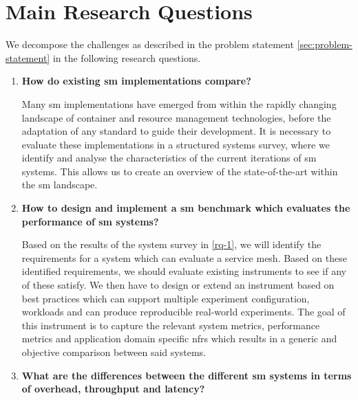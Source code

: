 \section{Main Research Questions}
\label{sec:research-questions}

We decompose the challenges as described in the problem statement \cref{sec:problem-statement} in the following research questions.




\begin{enumerate}[label=\textbf{RQ\arabic*}, leftmargin=3\parindent]
    \item \textbf{How do existing \gls{sm} implementations compare?}
    \label{rq-1}
    
    Many \gls{sm} implementations have emerged from within the rapidly changing landscape of container and resource management technologies, before the adaptation of any standard to guide their development. It is necessary to evaluate these implementations in a structured systems survey, where we identify and analyse the characteristics of the current iterations of \gls{sm} systems. This allows us to create an overview of the state-of-the-art within the \gls{sm} landscape.
    
    \item \textbf{How to design and implement a \gls{sm} benchmark which evaluates the performance of \gls{sm} systems?}
    \label{rq-2}
    
    Based on the results of the system survey in \ref{rq-1}, we will identify the requirements for a system which can evaluate a service mesh. Based on these identified requirements, we should evaluate existing instruments to see if any of these satisfy. We then have to design or extend an instrument based on best practices \cite{folkerts2012benchmarking} which can support multiple experiment configuration, workloads and can produce reproducible real-world experiments. The goal of this instrument is to capture the relevant system metrics, performance metrics and application domain specific \glspl{nfr} which results in a generic and objective comparison between said systems.

    \item \textbf{What are the differences between the different \gls{sm} systems in terms of overhead, throughput and latency?}
    \label{rq-3}
    

\end{enumerate}
